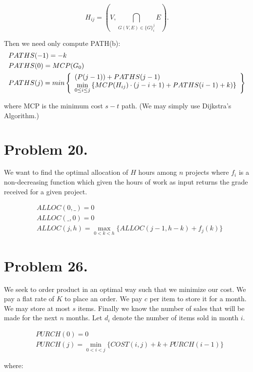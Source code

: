 \documentclass{amsart}
\theoremstyle{definition}
\theoremstyle{remark}
\numberwithin{equation}{section}
\begin{document}
$$ H_{ij} = \left( V, \bigcap_{G(V,E) \in \{G\}_{i}^j} E \right). $$

Then we need only compute PATH(b):
\algstar
\begin{align*}
  & PATHS(-1) = -k \\
  & PATHS(0) = MCP(G_0) \\
  & PATHS(j) =
      min \left\{ \begin{array} l(P(j-1)) + PATHS(j-1) \\
          \displaystyle\min_{0 \leq i \leq j} \left\{ MCP(H_{ij}) \cdot (j-i+1) + PATHS(i-1) + k) \right\}
           \end{array} \right\} \\
\end{align*}

where MCP is the minimum cost $s-t$ path. (We may simply use Dijkstra's Algorithm.)

\section{Problem 20.}

We want to find the optimal allocation of $H$ hours among $n$ projects where $f_i$ is a non-decreasing function which given the hours of work as input returns the grade received for a given project.

\algstar
\begin{align*}
  & ALLOC(0,\_) = 0 \\ 
  & ALLOC(\_,0) = 0 \\
  & ALLOC(j,h) =
    \max_{0<k<h} \{ ALLOC(j-1, h-k) + f_j(k) \} 
\end{align*}

\section{Problem 26.}
We seek to order product in an optimal way such that we minimize our cost. We pay a flat rate of $K$ to place an order. We pay $c$ per item to store it for a month. We may store at most $s$ items. Finally we know the number of sales that will be made for the next $n$ months. Let $d_i$ denote the number of items sold in month $i$.

\algstar
\begin{align*}
  & PURCH(0) = 0 \\ 
  & PURCH(j) =
    \min_{0<i<j} \{ COST(i,j) + k + PURCH(i-1) \} 
\end{align*}

where:
\end{document}
